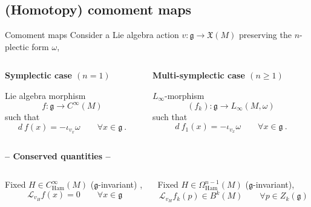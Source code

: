 \documentclass[handout,10pt]{beamer}
\begin{document}
\subsection{(Homotopy) comoment maps}
\begin{frame}{Comoment maps}
	Consider a Lie algebra action $v:\mathfrak{g} \to \mathfrak{X}(M)$  preserving the $n$-plectic form $\omega$,
	\vfill
	\begin{columns}
		\begin{column}{.5\linewidth}	
	\textbf{Symplectic case $(n=1)$}
		\begin{defblock}
			Lie algebra morphism
			$$ f: \mathfrak{g} \to C^\infty(M) $$
			such that
			$$ d~f (x) = -\iota_{v_x} \omega \qquad \forall x \in \mathfrak{g}~.$$
		\end{defblock}		
		\end{column}
		\begin{column}{.5\linewidth}	
	\textbf{Multi-symplectic case $(n\geq 1)$}
		\begin{defblock}
			$L_\infty$-morphism 
			$$ (f_k) : \mathfrak{g} \to L_\infty (M,\omega)$$
			such that
			$$ d~f_1(x) = -\iota_{v_x} \omega \qquad \forall x \in \mathfrak{g}~.$$
		\end{defblock}		
		\end{column}
	\end{columns}	
	\pause
	\centering \textbf{-- Conserved quantities --}
	\begin{columns}
		\begin{column}{.5\linewidth}		
			\begin{propblock}
				\small Fixed $H\in C^\infty_{\text{Ham}}(M)$ ($\mathfrak{g}$-invariant) ,
				$$\mathcal{L}_{v_H} f(x) = 0 \qquad \forall x \in \mathfrak{g}$$
			\end{propblock}
		\end{column}
		\begin{column}{.5\linewidth}			
			\begin{propblock}
				\small Fixed $H\in \Omega^{n-1}_{\text{Ham}}(M)$ ($\mathfrak{g}$-invariant),
				$$\mathcal{L}_{v_H} f_k(p) \in B^k(M) \qquad \forall p \in Z_k(\mathfrak{g})$$			
			\end{propblock}
		\end{column}
	\end{columns}



\end{frame}
\end{document}
